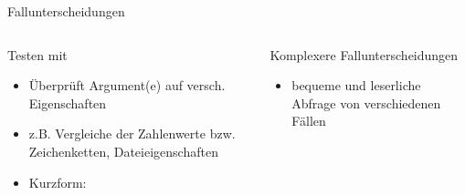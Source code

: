 \documentclass[aspectratio=43]{beamer}
\begin{document}
\begin{frame}{Fallunterscheidungen}
  \begin{columns}
    \begin{column}{0.5\textwidth}
      \begin{block}{Testen mit }
        \begin{itemize}
          \item Überprüft Argument(e) auf versch. Eigenschaften
          \item z.B. Vergleiche der Zahlenwerte bzw. Zeichenketten, Dateieigenschaften
          \item Kurzform: 
        \end{itemize}
      \end{block}
    \end{column}
    \begin{column}{0.55\textwidth}
       \begin{block}{Komplexere Fallunterscheidungen}
            \begin{itemize}
              \item bequeme und leserliche Abfrage von verschiedenen Fällen
            \end{itemize}
        \end{block}
    \end{column}
  \end{columns}
\end{frame}
\end{document}
